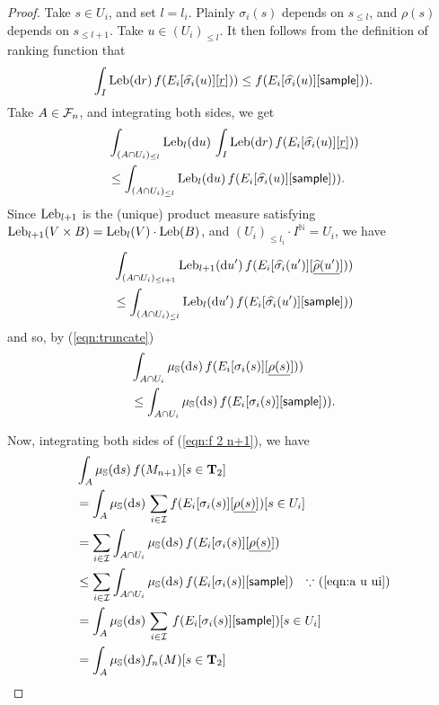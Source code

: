 \begin{proof}
Take $s \in U_i$, and set $l = l_i$.
Plainly $\sigma_i(s)$ depends on $s_{\leq l}$, and $\rho(s)$ depends on $s_{\leq l +1}$.
Take $u \in (U_i)_{\leq l}$.
It then follows from the definition of ranking function that
\[%
\int_I \Leb(\dif r) \, f(E_i[\widehat{\sigma_i}(u)][\underline{r}])) \leq f(E_i[\widehat{\sigma_i}(u)][\tsample])).
\]
Take $A \in \mathcal{F}_n$, and integrating both sides, we get
\begin{align*}
& \int_{(A \cap U_i)_{\leq l}} \mathrm{Leb}_l(\mathrm{d} u) \, \int_I \textrm{Leb}(\mathrm{d} r) \, f(E_i[\widehat{\sigma_i}(u)][\underline{r}])) \\
& \leq \int_{(A \cap U_i)_{\leq l}} \mathrm{Leb}_l(\mathrm{d} u) \, f(E_i[\widehat{\sigma_i}(u)][\mathsf{sample}])).
\end{align*}
Since $\mathrm{Leb}_{l+1}$ is the (unique) product measure satisfying $\mathrm{Leb}_{l+1}(V \times B) = \mathrm{Leb}_l(V) \cdot \mathrm{Leb}(B)$, and $(U_i)_{\leq l_i} \cdot I^{\mathbb N} = U_i$, we have
\begin{align*}
& \int_{(A \cap U_i)_{\leq l+1}} \mathrm{Leb}_{l+1}(\mathrm{d} u') \, f(E_i[\widehat{\sigma_i}(u')][\underline{\widehat{\rho}(u')}])) \\
& \leq 
\int_{(A \cap U_i)_{\leq l}} \mathrm{Leb}_l(\mathrm{d} u') \, f(E_i[\widehat{\sigma_i}(u')][\mathsf{sample}]))
\end{align*}
and so, by (\ref{eqn:truncate})
\begin{align}
& \int_{A \cap U_i} \mu_{{\mathbb{S}}}(\mathrm{d} s) \, f(E_i[\sigma_i(s)][\underline{\rho(s)}])) \nonumber \\
& \leq 
\int_{A \cap U_i} \mu_{{\mathbb{S}}}(\mathrm{d} s) \, f(E_i[\sigma_i(s)][\mathsf{sample}])).
\label{eqn:a u ui}
\end{align}

Now, integrating both sides of (\ref{eqn:f 2 n+1}), we have
\begin{align*}
& \int_A \mu_{{\mathbb{S}}}(\mathrm{d} s) \, f(M_{n+1})[s \in \mathbf{T}_2] \\
&= 
\int_A \mu_{{\mathbb{S}}}(\mathrm{d} s) \, \sum_{i \in \mathcal{I}} f(E_i[\sigma_i(s)][\underline{\rho(s)}])[s \in U_i] \\
&= 
\sum_{i \in \mathcal{I}} \int_{A \cap U_i} \mu_{{\mathbb{S}}}(\mathrm{d} s) \, f(E_i[\sigma_i(s)][\underline{\rho(s)}])\\
&\leq 
\sum_{i \in \mathcal{I}} \int_{A \cap U_i} \mu_{{\mathbb{S}}}(\mathrm{d} s) \, f(E_i[\sigma_i(s)][\mathsf{sample}])
\quad \hbox{$\because$ (\ref{eqn:a u ui})}\\
&= 
\int_{A} \mu_{{\mathbb{S}}}(\mathrm{d} s) \, \sum_{i \in \mathcal{I}} \, f(E_i[\sigma_i(s)][\mathsf{sample}])[s \in U_i]\\
&= \int_{A} \mu_{{\mathbb{S}}}(\mathrm{d} s) f_{n}(M)[s \in \mathbf{T}_2]
\end{align*}

\end{proof}

